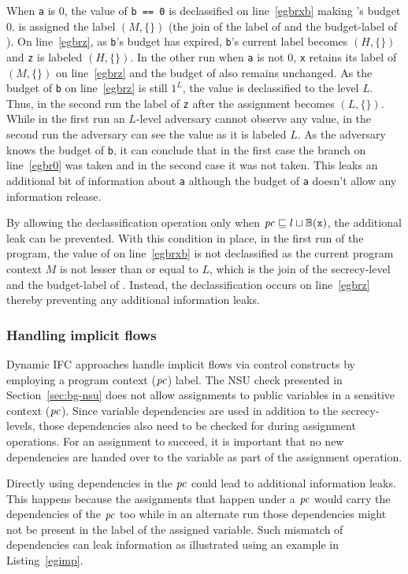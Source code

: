 When \texttt{a} is $0$, the value of \texttt{b == 0} is declassified
on line~\ref{egbrxb} making 's budget $0$.  is assigned
the label $(M, \{\})$ (the join of the label of  and the
budget-label of ). On line~\ref{egbrz}, as \texttt{b}'s budget
has expired, \texttt{b}'s current label becomes $(H, \{\})$ and
\texttt{z} is labeled $(H, \{\})$. In the other run when \texttt{a} is
not $0$, \texttt{x} retains its label of $(M, \{\})$ on
line~\ref{egbrz} and the budget of  also remains unchanged. As
the budget of \texttt{b} on line~\ref{egbrz} is still $1^L$, the value is
declassified to the level $L$. Thus, in the second run the label of
\texttt{z} after the assignment becomes $(L, \{\})$.  While in the
first run an $L$-level adversary cannot observe any value, in the
second run  the adversary can see the value as it is labeled $L$. As
the adversary knows the budget of \texttt{b}, it can conclude that in
the first case  the branch on line~\ref{egbr0} was taken and in the
second case it was not taken. This leaks an additional bit of
information about \texttt{a} although the budget of \texttt{a} doesn't
allow any information release. 

By allowing the declassification operation only when $\mathit{pc} \sqsubseteq l \sqcup
\mathbb{B}(\texttt{x})$, the additional leak can be prevented. With this
condition in place, in the first run of the program, the value of 
 on line~\ref{egbrxb} is not declassified as the current
program context $M$ is not lesser than or equal to $L$, which is the
join of the secrecy-level and the budget-label of . Instead, the
declassification occurs on line~\ref{egbrz} thereby preventing any
additional information leaks. 

\subsubsection{\textbf{Handling implicit flows}}
\label{aspect:if}
Dynamic IFC approaches handle implicit flows via control constructs by
employing a program context ($\mathit{pc}$) label. The NSU check presented in
Section~\ref{sec:bg-nsu} does not allow assignments 
to public variables in a sensitive context ($\mathit{pc}$). Since variable
dependencies are used in addition to the secrecy-levels, those
dependencies also need to be checked for during assignment
operations. For an assignment to succeed, it is important that
no new dependencies are handed over to the variable as part of the
assignment operation. 

Directly using dependencies in the $\mathit{pc}$ could lead to
additional information leaks. This happens because the assignments
that happen under a $\mathit{pc}$ would carry the dependencies of
the $\mathit{pc}$ too while in an alternate run those dependencies might not
be present in the label of the assigned variable. Such mismatch of
dependencies can leak information as illustrated using an example in
Listing~\ref{egimp}.

